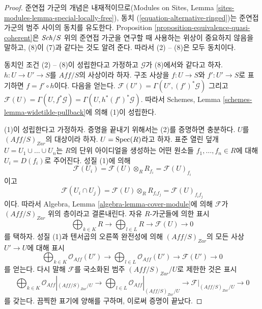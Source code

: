 \begin{proof}
준연접 가군의 개념은 내재적이므로(Modules on Sites, Lemma
\ref{sites-modules-lemma-special-locally-free}), 동치
(\ref{equation-alternative-ringed})는 준연접 가군의 범주 사이의 동치를
유도한다. Proposition \ref{proposition-equivalence-quasi-coherent}은
$\mathit{Sch}/S$ 위의 준연접 가군을 연구할 때 사용하는 위상이 중요하지 않음을
말하고, (8)이 (7)과 같다는 것도 알려 준다. 따라서 (2) -- (8)은 모두 동치이다.

\medskip\noindent
동치인 조건 (2) -- (8)이 성립한다고 가정하고 $\mathcal{G}$가 (8)에서와
같다고 하자. $h : U \to U' \to S$를 $\textit{Aff}/S$의 사상이라 하자.
구조 사상을 $f : U \to S$와 $f' : U' \to S$로 표기하면
$f = f' \circ h$이다. 다음을 얻는다.
$\mathcal{F}(U') = \Gamma(U', (f')^*\mathcal{G})$ 그리고
$\mathcal{F}(U) = \Gamma(U, f^*\mathcal{G}) = \Gamma(U, h^*(f')^*\mathcal{G})$.
따라서 Schemes, Lemma \ref{schemes-lemma-widetilde-pullback}에 의해
(1)이 성립한다.

\medskip\noindent
(1)이 성립한다고 가정하자. 증명을 끝내기 위해서는 (2)를 증명하면 충분하다.
$U$를 $(\textit{Aff}/S)_{Zar}$의 대상이라 하자. $U = \mathop{\mathrm{Spec}}(R)$라고 하자.
표준 열린 덮개 $U = U_1 \cup \ldots \cup U_n$는 $R$의 단위 아이디얼을
생성하는 어떤 원소들 $f_1, \ldots, f_n \in R$에 대해
$U_i = D(f_i)$로 주어진다. 성질 (1)에 의해
$$
\mathcal{F}(U_i) =
\mathcal{F}(U) \otimes_R R_{f_i} =
\mathcal{F}(U)_{f_i}
$$
이고
$$
\mathcal{F}(U_i \cap U_j) =
\mathcal{F}(U) \otimes_R R_{f_if_j} =
\mathcal{F}(U)_{f_if_j}
$$
이다. 따라서 Algebra, Lemma \ref{algebra-lemma-cover-module}에 의해
$\mathcal{F}$가 $(\textit{Aff}/S)_{Zar}$ 위의 층이라고 결론내린다.
자유 $R$-가군들에 의한 표시
$$
\bigoplus\nolimits_{k \in K} R
\longrightarrow
\bigoplus\nolimits_{l \in L} R
\longrightarrow
\mathcal{F}(U)
\longrightarrow 0
$$
를 택하자. 성질 (1)과 텐서곱의 오른쪽 완전성에 의해
$(\textit{Aff}/S)_{Zar}$의 모든 사상 $U' \to U$에 대해 표시
$$
\bigoplus\nolimits_{k \in K} \mathcal{O}_{Aff}(U')
\longrightarrow
\bigoplus\nolimits_{l \in L} \mathcal{O}_{Aff}(U')
\longrightarrow
\mathcal{F}(U')
\longrightarrow 0
$$
를 얻는다. 다시 말해 $\mathcal{F}$를 국소화된 범주
$(\textit{Aff}/S)_{Zar}/U$로 제한한 것은 표시
$$
\bigoplus\nolimits_{k \in K} \mathcal{O}_{Aff}|_{(\textit{Aff}/S)_{Zar}/U}
\longrightarrow
\bigoplus\nolimits_{l \in L} \mathcal{O}_{Aff}|_{(\textit{Aff}/S)_{Zar}/U}
\longrightarrow
\mathcal{F}|_{(\textit{Aff}/S)_{Zar}/U}
\longrightarrow 0
$$
를 갖는다. 끔찍한 표기에 양해를 구하며, 이로써 증명이 끝났다.
\end{proof}

